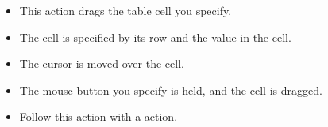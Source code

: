 

\begin{itemize}
\item This action drags the table cell you specify.
\item The cell is specified by its row and the value in the cell. 
\item The cursor is moved over the cell.
\item The mouse button you specify is held, and the cell is dragged. 
\item Follow this action with a  action.
\end{itemize}


